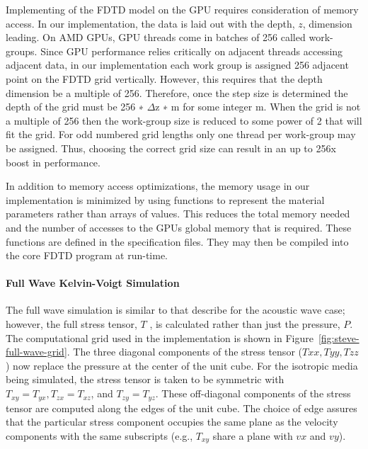Implementing of the FDTD model on the GPU requires consideration of memory
access.  In our implementation, the data is laid out with the depth, $z$,
dimension leading. On AMD GPUs, GPU threads come in batches of 256 called
work-groups.  Since GPU performance relies critically on adjacent threads
accessing adjacent data, in our implementation each work group is assigned 256
adjacent point on the FDTD grid vertically. However, this requires that the
depth dimension be a multiple of 256. Therefore, once the step size is
determined the depth of the grid must be 256 ∗ $\Delta$z ∗ m for some integer
m. When the grid is not a multiple of 256 then the work-group size is reduced
to some power of 2 that will fit the grid. For odd numbered grid lengths only
one thread per work-group may be assigned. Thus, choosing the correct grid size
can result in an up to 256x boost in performance. 

In addition to memory access optimizations, the memory usage in our
implementation is minimized by using functions to represent the material
parameters rather than arrays of values. This reduces the total memory needed
and the number of accesses to the GPUs global memory that is required. These
functions are defined in the specification files. They may then be compiled
into the core FDTD program at run-time. 

\paragraph{Full Wave Kelvin-Voigt Simulation}
The full wave simulation is similar to that describe for the acoustic wave
case; however, the full stress tensor, $T$ , is calculated rather than just the
pressure, $P$. The computational grid used in the implementation is shown in
Figure~\ref{fig:steve-full-wave-grid}. The three diagonal components of the
stress tensor ($Txx, Tyy, Tzz$) now replace the pressure at the center of the
unit cube. For the isotropic media being simulated, the stress tensor is taken
to be symmetric with $T_{xy} = T_{yx}, T_{zx} = T_{xz}$, and $T_{zy} = T_{yz}$.
These off-diagonal components of the stress tensor are computed along the edges
of the unit cube.  The choice of edge assures that the particular stress
component occupies the same plane as the velocity components with the same
subscripts (e.g., $T_{xy}$ share a plane with $vx$ and $vy$). 

